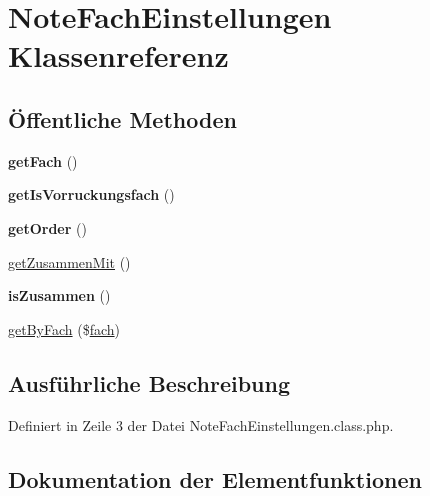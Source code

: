\hypertarget{class_note_fach_einstellungen}{}\section{Note\+Fach\+Einstellungen Klassenreferenz}
\label{class_note_fach_einstellungen}
\subsection*{Öffentliche Methoden}
\begin{DoxyCompactItemize}
\item 
\mbox{\label{class_note_fach_einstellungen_a1a347e753426db1598473581d3773b1b}} 
{\bfseries get\+Fach} ()
\item 
\mbox{\label{class_note_fach_einstellungen_a16aa5b5f7fc1b056f5ae29565a6ed4b6}} 
{\bfseries get\+Is\+Vorruckungsfach} ()
\item 
\mbox{\label{class_note_fach_einstellungen_a4d32c16e18733ebbce7f6a205cfea223}} 
{\bfseries get\+Order} ()
\item 
\mbox{\hyperlink{class_note_fach_einstellungen_a133fb2708c5300d6a3b1d63d0f7b081f}{get\+Zusammen\+Mit}} ()
\item 
\mbox{\label{class_note_fach_einstellungen_a2886784bd6c1d28a7d55fd3f6c828a23}} 
{\bfseries is\+Zusammen} ()
\item 
\mbox{\hyperlink{class_note_fach_einstellungen_ae2efaf0fb1894e299a08c3e814226b46}{get\+By\+Fach}} (\$\mbox{\hyperlink{classfach}{fach}})
\end{DoxyCompactItemize}


\subsection{Ausführliche Beschreibung}


Definiert in Zeile 3 der Datei Note\+Fach\+Einstellungen.\+class.\+php.



\subsection{Dokumentation der Elementfunktionen}
\mbox{\label{class_note_fach_einstellungen_ae2efaf0fb1894e299a08c3e814226b46}} 

